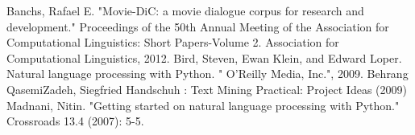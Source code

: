 \begin{thebibliography}{2}
%
Banchs, Rafael E. "Movie-DiC: a movie dialogue corpus for research and development." Proceedings of the 50th Annual Meeting of the Association for Computational Linguistics: Short Papers-Volume 2. Association for Computational Linguistics, 2012.
% 
Bird, Steven, Ewan Klein, and Edward Loper. Natural language processing with Python. " O'Reilly Media, Inc.", 2009.
% 
Behrang QasemiZadeh, Siegfried Handschuh : Text Mining Practical: Project Ideas (2009)
% 
Madnani, Nitin. "Getting started on natural language processing with Python." Crossroads 13.4 (2007): 5-5.
\end{thebibliography}
